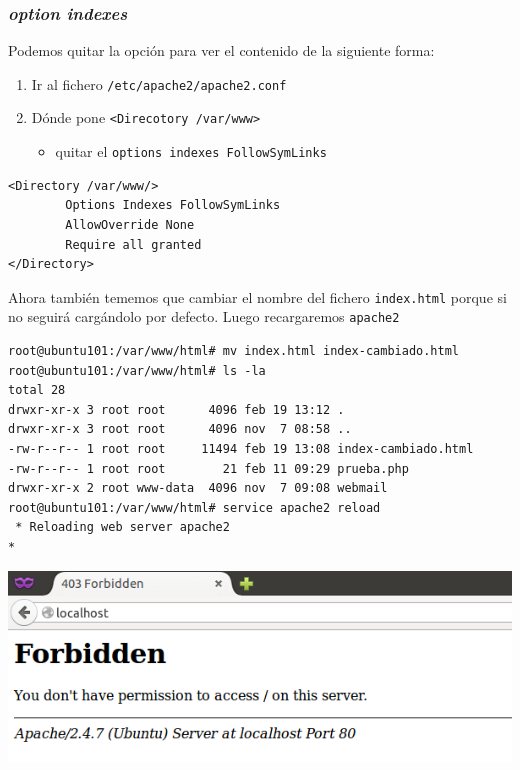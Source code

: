 \documentclass[11pt]{article}
\begin{document}
\subsubsection{\emph{option indexes}}
\label{sec:org9ac6a48}
Podemos quitar la opción para ver el contenido de la siguiente forma:
\begin{enumerate}
\item Ir al fichero \texttt{/etc/apache2/apache2.conf}
\item Dónde pone \texttt{<Direcotory /var/www>}
\begin{itemize}
\item quitar el \texttt{options indexes FollowSymLinks}
\end{itemize}
\end{enumerate}
\begin{verbatim}
<Directory /var/www/>
        Options Indexes FollowSymLinks
        AllowOverride None
        Require all granted
</Directory>
\end{verbatim}

Ahora también tememos que cambiar el nombre del fichero \texttt{index.html} porque si no seguirá cargándolo por defecto. Luego recargaremos \texttt{apache2}
\begin{verbatim}
root@ubuntu101:/var/www/html# mv index.html index-cambiado.html
root@ubuntu101:/var/www/html# ls -la
total 28
drwxr-xr-x 3 root root      4096 feb 19 13:12 .
drwxr-xr-x 3 root root      4096 nov  7 08:58 ..
-rw-r--r-- 1 root root     11494 feb 19 13:08 index-cambiado.html
-rw-r--r-- 1 root root        21 feb 11 09:29 prueba.php
drwxr-xr-x 2 root www-data  4096 nov  7 09:08 webmail
root@ubuntu101:/var/www/html# service apache2 reload 
 * Reloading web server apache2                                                                                             * 
\end{verbatim}

\begin{center}
\includegraphics[width=.9\linewidth]{./media/apache-3.png}
\end{center}
\end{document}

